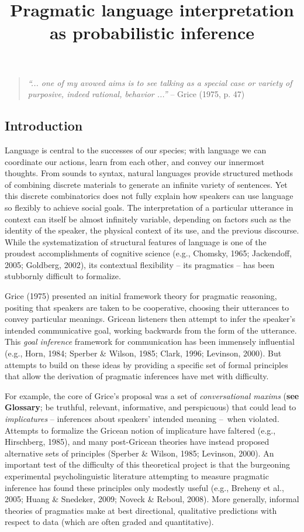 \documentclass[]{elsarticle}
\title{\hyperdef{}{h.9p66emvfkv2}{\label{h.9p66emvfkv2}}{}Pragmatic language
interpretation as probabilistic inference}
\date{}
\begin{document}
\maketitle

\begin{quote}
\emph{``... one of my avowed aims is to see talking as a special case or
variety of purposive, indeed rational, behavior ...''} -- Grice (1975,
p. 47)
\end{quote}

\subsection{Introduction}\label{introduction}

Language is central to the successes of our species; with language we
can coordinate our actions, learn from each other, and convey our
innermost thoughts. From sounds to syntax, natural languages provide
structured methods of combining discrete materials to generate an
infinite variety of sentences. Yet this discrete combinatorics does not
fully explain how speakers can use language so flexibly to achieve
social goals. The interpretation of a particular utterance in context
can itself be almost infinitely variable, depending on factors such as
the identity of the speaker, the physical context of its use, and the
previous discourse. While the systematization of structural features of
language is one of the proudest accomplishments of cognitive science
(e.g., Chomsky, 1965; Jackendoff, 2005; Goldberg, 2002), its contextual
flexibility -- its pragmatics -- has been stubbornly difficult to
formalize.

Grice (1975) presented an initial framework theory for pragmatic
reasoning, positing that speakers are taken to be cooperative, choosing
their utterances to convey particular meanings. Gricean listeners then
attempt to infer the speaker's intended communicative goal, working
backwards from the form of the utterance. This \emph{goal inference}
framework for communication has been immensely influential (e.g., Horn,
1984; Sperber \& Wilson, 1985; Clark, 1996; Levinson, 2000). But
attempts to build on these ideas by providing a specific set of formal
principles that allow the derivation of pragmatic inferences have met
with difficulty.

For example, the core of Grice's proposal was a set of
\emph{conversational maxims} (\textbf{see Glossary}; be truthful,
relevant, informative, and perspicuous) that could lead to
\emph{implicatures} -- inferences about speakers' intended meaning
--~when violated. Attempts to formalize the Gricean notion of
implicature have faltered (e.g., Hirschberg, 1985), and many
post-Gricean theories have instead proposed alternative sets of
principles (Sperber \& Wilson, 1985; Levinson, 2000). An important test
of the difficulty of this theoretical project is that the burgeoning
experimental psycholinguistic literature attempting to measure pragmatic
inference has found these principles only modestly useful (e.g., Breheny
et al., 2005; Huang \& Snedeker, 2009; Noveck \& Reboul, 2008). More
generally, informal theories of pragmatics make at best directional,
qualitative predictions with respect to data (which are often graded and
quantitative).
\end{document}
